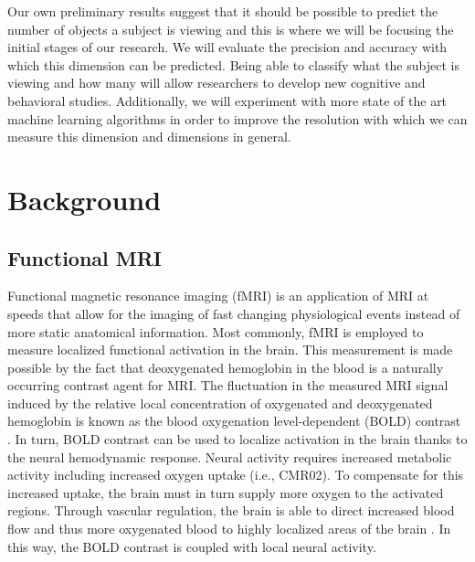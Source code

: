 \documentclass[12pt]{article}
\begin{document}
Our own preliminary results suggest that it should be possible to predict the number of objects a subject is viewing and this is where we will be focusing the initial stages of our research.
We will evaluate the precision and accuracy with which this dimension can be predicted.
Being able to classify what the subject is viewing and how many will allow researchers to develop new cognitive and behavioral studies. 
Additionally, we will experiment with more state of the art machine learning algorithms in order to improve the resolution with which we can measure this dimension and dimensions in general.

\section{Background}

\subsection{Functional MRI}
Functional magnetic resonance imaging (fMRI) is an application of MRI at speeds that allow for the imaging of fast changing physiological events instead of more static anatomical information.
Most commonly, fMRI is employed to measure localized functional activation in the brain.
This measurement is made possible by the fact that deoxygenated hemoglobin in the blood is a naturally occurring contrast agent for MRI.
The fluctuation in the measured MRI signal induced by the relative local concentration of oxygenated and deoxygenated hemoglobin is known as the blood oxygenation level-dependent (BOLD) contrast \cite{Ogawa1990}.
In turn, BOLD contrast can be used to localize activation in the brain thanks to the neural hemodynamic response.
Neural activity requires increased metabolic activity including increased oxygen uptake (i.e., CMR02).
To compensate for this increased uptake, the brain must in turn supply more oxygen to the activated regions.
Through vascular regulation, the brain is able to direct increased blood flow and thus more oxygenated blood to highly localized areas of the brain \cite{Buxton2004}.
In this way, the BOLD contrast is coupled with local neural activity.
\end{document}
